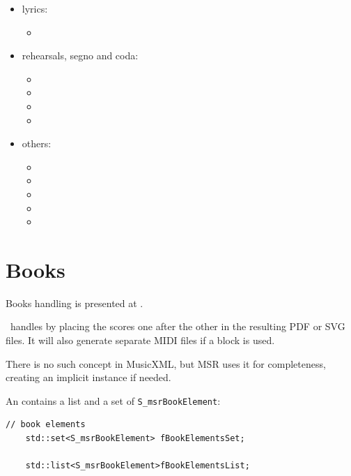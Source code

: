 \begin{itemize}
\item lyrics:

\begin{itemize}
	\item {}
  \end{itemize}

\item rehearsals, segno and coda:

\begin{itemize}
  \item {}
	\item {}
  \item {}
  \item {}
 \end{itemize}

\item others:

\begin{itemize}
  \item {}
  \item {}
  \item {}
  \item {}
  \item {}
  \end{itemize}

\end{itemize}


\section{Books}\label{Books}

Books handling is presented at .

\lily\ handles  by placing the scores one after the other in the resulting PDF or SVG files. It will also generate separate MIDI files if a  block is used.

There is no such concept in MusicXML, but MSR uses it for completeness, creating an implicit  instance if needed.

An  contains a list and a set of {\tt S_msrBookElement}:
\begin{lstlisting}[language=CPlusPlus]
    // book elements
    std::set<S_msrBookElement> fBookElementsSet;

    std::list<S_msrBookElement>fBookElementsList;
\end{lstlisting}

